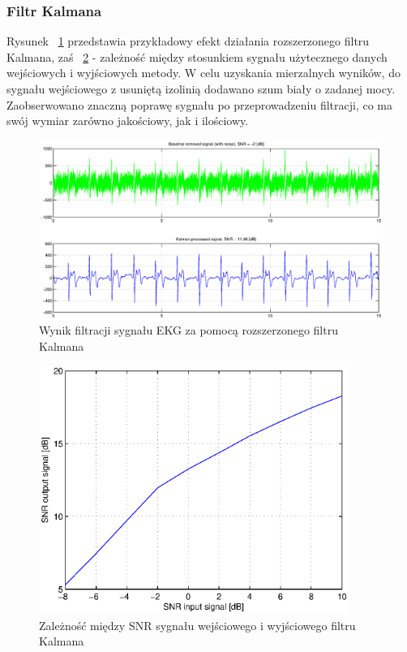 \subsubsection{Filtr Kalmana}
Rysunek ~\ref{fig:KalmanOutput} przedstawia przykładowy efekt działania rozszerzonego filtru Kalmana, zaś ~\ref{fig:KalmanSNR} - zależność między stosunkiem sygnału użytecznego danych wejściowych i wyjściowych metody. W celu uzyskania mierzalnych wyników, do sygnału wejściowego z usuniętą izolinią dodawano szum biały o zadanej mocy. Zaobserwowano znaczną poprawę sygnału po przeprowadzeniu filtracji, co ma swój wymiar zarówno jakościowy, jak i ilościowy. 

\begin{figure}[H]
\centering
	\includegraphics[width=\textwidth]{ECG_BASELINE/figures/hardCoreNoise.eps}
\caption{Wynik filtracji sygnału EKG za pomocą rozszerzonego filtru Kalmana}
\label{fig:KalmanOutput}
\end{figure}

\begin{figure}[H]
\centering
	\includegraphics[width=0.9\textwidth]{ECG_BASELINE/figures/snrInOut.eps}
\caption{Zależność między SNR sygnału wejściowego i wyjściowego filtru Kalmana}
\label{fig:KalmanSNR}
\end{figure}



